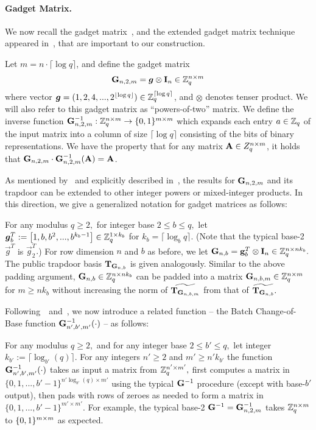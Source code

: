 \paragraph{Gadget Matrix.} We now recall the gadget matrix~\cite{EC:MicPei12,C:AlpPei14}, and the extended gadget matrix technique appeared in~\cite{EPRINT:ApoFanLiu16a}, that are important to our construction.
\begin{definition}
Let $m = n \cdot \lceil\log q \rceil$, and define the gadget matrix
$$\mathbf{G}_{n, 2, m} = \boldsymbol{g} \otimes \mathbf{I}_n \in \mathbb{Z}_q^{n \times m}$$
where vector $\boldsymbol{g} = (1, 2, 4,..., 2^{\lfloor \log q \rfloor}) \in \mathbb{Z}_q^{\lceil \log q \rceil}$, and $\otimes$ denotes tenser product. We will also refer to this gadget matrix as ``powers-of-two'' matrix. We define the inverse function $\mathbf{G}^{-1}_{n, 2, m}: \mathbb{Z}_q^{n \times m} \rightarrow \{0,1\}^{m \times m}$ which expands each entry $a \in \mathbb{Z}_q$ of the input matrix into a column of size $\lceil \log q \rceil$ consisting of the bits of binary representations. We have the property that for any matrix $\mathbf{A} \in Z_q^{n \times m}$, it holds that $\mathbf{G}_{n, 2, m} \cdot \mathbf{G}^{-1}_{n, 2, m}(\mathbf{A}) = \mathbf{A}$.
\end{definition}
As mentioned by~\cite{EC:MicPei12} and explicitly described in~\cite{EPRINT:ApoFanLiu16a}, the results for $\mathbf{G}_{n, 2, m}$ and its trapdoor can be extended to other integer powers or mixed-integer products. In this direction, we give
a generalized notation for gadget matrices as follows:

For any modulus $q\ge 2,$ for integer base $2 \le b \le q,$ let $\boldsymbol{g}_{b}^T := \left[1, b, b^2, ..., b^{k_b-1}\right]\in\mathbb{Z}_q^{1\times k_b}$ for $k_b = \lceil\log_b{q}\rceil.$ (Note that the typical base-2 $\vec g^T$ is $\vec g_2^T.$) For row dimension $n$ and $b$ as before, we let $\mathbf{G}_{n, b} = \mathbf{g}_{b}^T\otimes\mathbf{I}_{n}\in\mathbb{Z}_q^{n\times nk_b}.$ The public trapdoor basis $\mathbf{T}_{\mathbf{G}_{n, b}}$ is given analogously. Similar to the above padding argument, $\mathbf{G}_{n, b}\in\mathbb{Z}_q^{n\times nk_b}$ can be padded into a matrix $\mathbf{G}_{n, b, m}\in\mathbb{Z}_{q}^{n\times m}$ for $m\geq  nk_b$ without increasing the norm of $\widetilde{\mathbf{T}_{\mathbf{G}_{n, b, m}}}$ from that of $\widetilde{\mathbf{T}_{\mathbf{G}_{n, b}}}.$

Following~\cite{PKC:Xagawa13}~and~\cite{C:AlpPei14}, we now introduce a related function -- the Batch Change-of-Base function $\mathbf{G}_{n', b', m'}^{-1}(\cdot)$ -- as follows:

For any modulus $q\ge 2,$ and for any integer base $2 \le b' \le q,$ let integer $k_{b'} := \lceil\log_{b'}(q)\rceil.$
For any integers $n'\ge 2$ and $m'\ge n'k_{b'}$ the function $\mathbf{G}_{n', b', m'}^{-1}(\cdot)$ takes as input a matrix from $\mathbb{Z}_q^{n'\times m'},$ first computes a matrix in $\{0, 1, ..., b'-1\}^{n'\log_{b'}(q)\times m'}$ using the typical $\mathbf{G}^{-1}$ procedure (except with base-$b'$ output), then pads with rows of zeroes as needed to form a matrix in $\{0, 1, ..., b'-1\}^{m'\times m'}.$ For example, the typical base-2 $\mathbf{G}^{-1} = \mathbf{G}^{-1}_{n, 2, m}$ takes $\mathbb{Z}_q^{n\times m}$ to $\{0,1\}^{m\times m}$ as expected.
